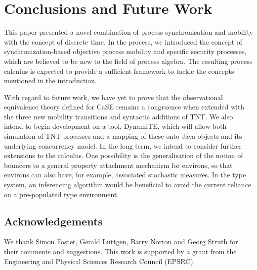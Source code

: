 \documentclass[orivec,envcountsame]{llncs}
\begin{document}
\section{Conclusions and Future Work}
\label{futurework}

This paper presented a novel combination of process synchronisation and
mobility with the concept of discrete time.  In the process, we
introduced the concept of synchronization-based objective process
mobility and specific security processes, which are believed to be new
to the field of process algebra.  The resulting process calculus is
expected to provide a sufficient framework to tackle the concepts
mentioned in the introduction.

With regard to future work, we have yet to prove that the observational
equivalence theory defined for CaSE remains a congruence when extended
with the three new mobility transitions and syntactic additions of TNT.  We
also intend to begin development on a tool, DynamiTE, which will allow
both simulation of TNT processes and a mapping of these onto Java
objects and its underlying concurrency model.  In the long term, we
intend to consider further extensions to the calculus.  One possibility
is the generalisation of the notion of bouncers to a general property
attachment mechanism for environs, so that environs can also have, for
example, associated stochastic measures.  In the type system, an
inferencing algorithm would be beneficial to avoid the current reliance
on a pre-populated type environment.

\subsection*{Acknowledgements}

We thank Simon Foster, Gerald L{\"u}ttgen, Barry Norton and Georg Struth
for their comments and suggestions.  This work is supported by a grant
from the Engineering and Physical Sciences Research Council ({EPSRC}).



\end{document}
